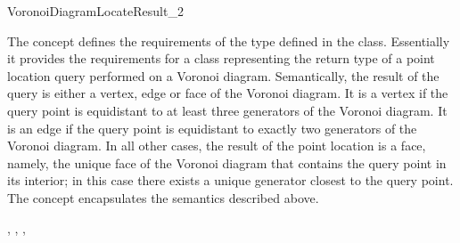 


\begin{ccRefConcept}{VoronoiDiagramLocateResult_2}

\ccDefinition

The concept  defines the requirements of the
 type defined in the 
class. Essentially it provides the requirements for a class
representing the return type of a point location query performed on a
Voronoi diagram. Semantically, the result of the query is either a
vertex, edge or face of the Voronoi diagram. It is a vertex if the
query point is equidistant to at least three generators of the Voronoi
diagram. It is an edge if the query point is equidistant to exactly
two generators of the Voronoi diagram. In all other cases, the result
of the point location is a face, namely, the unique face of the
Voronoi diagram that contains the query point in its interior; in this
case there exists a unique generator closest to the query point. The
 concept encapsulates the 
semantics described above.

\ccRefines
{}, , ,

\ccTypes
{}
\ccThreeToTwo
%
\ccGlue
{}
\ccGlue
{}



\end{ccRefConcept}

